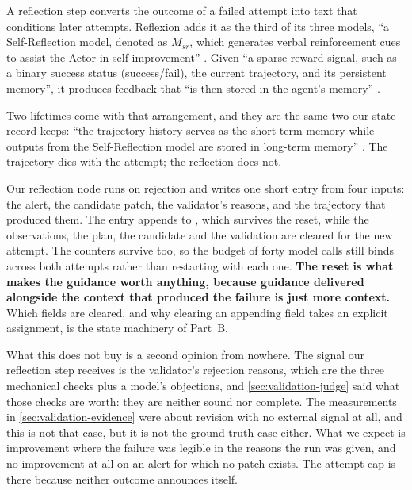 \ei

\begin{definition}
\label{def:reflection}
A reflection step converts the outcome of a failed attempt into text that conditions later attempts.
Reflexion adds it as the third of its three models, ``a Self-Reflection model, denoted as $M_{sr}$,
which generates verbal reinforcement cues to assist the Actor in
self-improvement'' \citep[\S3]{shinn2023reflexion}. Given ``a sparse reward signal, such as a binary
success status (success/fail), the current trajectory, and its persistent memory'', it produces
feedback that ``is then stored in the agent's memory'' \citep[\S3]{shinn2023reflexion}.
\end{definition}

Two lifetimes come with that arrangement, and they are the same two our state record keeps: ``the
trajectory history serves as the short-term memory while outputs from the Self-Reflection model are
stored in long-term memory'' \citep[\S3]{shinn2023reflexion}. The trajectory dies with the attempt;
the reflection does not.

Our reflection node runs on rejection and writes one short entry from four inputs: the alert, the
candidate patch, the validator's reasons, and the trajectory that produced them. The entry appends
to , which survives the reset, while the observations, the plan, the candidate
and the validation are cleared for the new attempt. The counters survive too, so the budget of forty
model calls still binds across both attempts rather than restarting with each one.
\textbf{The reset is what makes the guidance worth anything, because guidance delivered alongside
the context that produced the failure is just more context.} Which fields are cleared, and why
clearing an appending field takes an explicit assignment, is the state machinery of Part~B.

What this does not buy is a second opinion from nowhere. The signal our reflection step receives is
the validator's rejection reasons, which are the three mechanical checks plus a model's objections,
and \cref{sec:validation-judge} said what those checks are worth: they are neither sound nor
complete. The measurements in \cref{sec:validation-evidence} were about revision with no external
signal at all, and this is not that case, but it is not the ground-truth case either. What we expect
is improvement where the failure was legible in the reasons the run was given, and no improvement at
all on an alert for which no patch exists. The attempt cap is there because neither outcome
announces itself.

